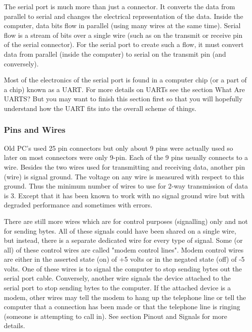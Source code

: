 \documentclass[11pt, twosides, titlepage]{article}
\begin{document}
            The serial port is much more than just a connector. It converts the data from parallel to serial and changes the electrical representation of the data. Inside the computer, data bits flow in parallel (using many wires at the same time). Serial flow is a stream of bits over a single wire (such as on the transmit or receive pin of the serial connector). For the serial port to create such a flow, it must convert data from parallel (inside the computer) to serial on the transmit pin (and conversely).
            
            Most of the electronics of the serial port is found in a computer chip (or a part of a chip) known as a UART. For more details on UARTs see the section What Are UARTS? But you may want to finish this section first so that you will hopefully understand how the UART fits into the overall scheme of things.

        \subsubsection{Pins and Wires}

            Old PC's used 25 pin connectors but only about 9 pins were actually used so later on most connectors were only 9-pin. Each of the 9 pins usually connects to a wire. Besides the two wires used for transmitting and receiving data, another pin (wire) is signal ground. The voltage on any wire is measured with respect to this ground. Thus the minimum number of wires to use for 2-way transmission of data is 3. Except that it has been known to work with no signal ground wire but with degraded performance and sometimes with errors.

            There are still more wires which are for control purposes (signalling) only and not for sending bytes. All of these signals could have been shared on a single wire, but instead, there is a separate dedicated wire for every type of signal. Some (or all) of these control wires are called "modem control lines". Modem control wires are either in the asserted state (on) of +5 volts or in the negated state (off) of -5 volts. One of these wires is to signal the computer to stop sending bytes out the serial port cable. Conversely, another wire signals the device attached to the serial port to stop sending bytes to the computer. If the attached device is a modem, other wires may tell the modem to hang up the telephone line or tell the computer that a connection has been made or that the telephone line is ringing (someone is attempting to call in). See section Pinout and Signals for more details.
\end{document}
